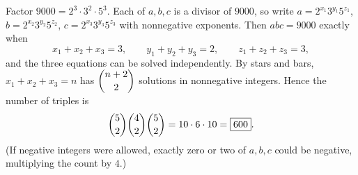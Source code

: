 Factor $9000=2^3\cdot3^2\cdot5^3$. Each of $a,b,c$ is a divisor of $9000$, so write $a=2^{x_1}3^{y_1}5^{z_1}$, $b=2^{x_2}3^{y_2}5^{z_2}$, $c=2^{x_3}3^{y_3}5^{z_3}$ with nonnegative exponents. Then $abc=9000$ exactly when
\[
x_1+x_2+x_3=3,\qquad y_1+y_2+y_3=2,\qquad z_1+z_2+z_3=3,
\]
and the three equations can be solved independently. By stars and bars, $x_1+x_2+x_3=n$ has $\dbinom{n+2}{2}$ solutions in nonnegative integers. Hence the number of triples is
\[
\dbinom{5}{2}\dbinom{4}{2}\dbinom{5}{2}=10\cdot6\cdot10=\boxed{600}.
\]
(If negative integers were allowed, exactly zero or two of $a,b,c$ could be negative, multiplying the count by $4$.)
